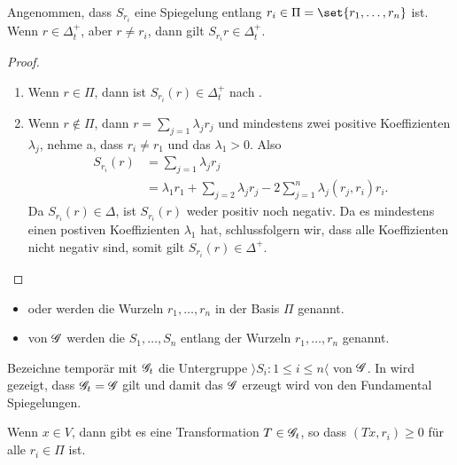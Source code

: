 \begin{proposition}
	Angenommen, dass $S_{r_i}$ eine Spiegelung entlang $r_i \in \Pi = \set{r_1, \dots, r_n}$ ist.\\
	Wenn $r \in \Delta_t^+$, aber $r \neq r_i$, dann gilt $S_{r_i}r \in \Delta_t^+$.
\end{proposition}
\begin{proof}
	\begin{enumerate}
		\item Wenn $r \in \Pi$, dann ist $S_{r_i}(r) \in \Delta_t^+$ nach .
		\item Wenn $r \notin \Pi$, dann $r = \sum_{j=1} \lambda_j r_j$ und mindestens zwei positive Koeffizienten $\lambda_j$, nehme a, dass $r_i \neq r_1$ und das $\lambda_1 > 0$. Also
		\begin{align*}
			S_{r_i}(r) &= \sum_{j=1} \lambda_j r_j \\
			&= \lambda_1 r_1 + \sum_{j=2} \lambda_j r_j - 2 \sum_{j=1}^n \lambda_j(r_j,r_i)r_i.
		\end{align*}
		Da $S_{r_i}(r) \in \Delta$, ist $S_{r_i}(r)$ weder positiv noch negativ. Da es mindestens einen postiven Koeffizienten $\lambda_1$ hat, schlussfolgern wir, dass alle Koeffizienten nicht negativ sind, somit gilt $S_{r_i}(r) \in \Delta^+$.
	\end{enumerate}
\end{proof}
\begin{*definition}
	\begin{itemize}
		\item {} oder  werden die Wurzeln $r_1, \dots, r_n$ in der Basis $\Pi$ genannt.
		\item {} von $\mathscr G$ werden die $S_1, \dots, S_n$ entlang der Wurzeln $r_1, \dots, r_n$ genannt.
	\end{itemize}
\end{*definition}
Bezeichne temporär mit $\mathscr G_t$ die Untergruppe $\rangle S_i \colon 1 \le i \le n\langle$ von $\mathscr G$. In  wird gezeigt, dass $\mathscr G_t = \mathscr G$ gilt und damit das $\mathscr G$ erzeugt wird von den Fundamental Spiegelungen.
\begin{proposition}
	Wenn $x \in V$, dann gibt es eine Transformation $T \in \mathscr G_t$, so dass $(Tx, r_i) \ge 0$ für alle $r_i \in \Pi$ ist.
\end{proposition}
